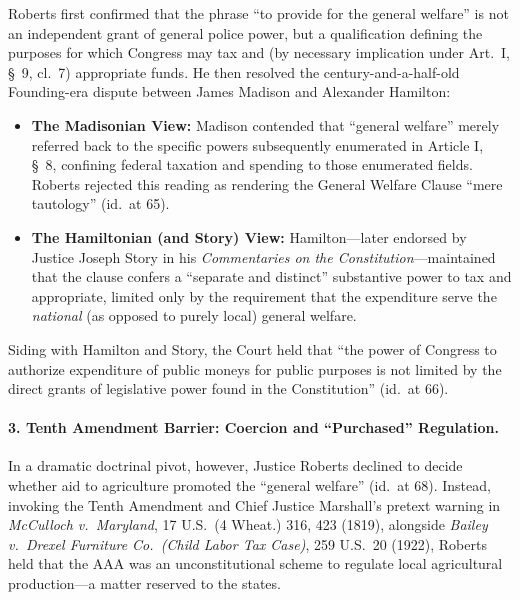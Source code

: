 \documentclass[12pt]{article}
\begin{document}
Roberts first confirmed that the phrase ``to provide for the general welfare'' is not an independent grant of general police power, but a qualification defining the purposes for which Congress may tax and (by necessary implication under Art.\ I, \S\ 9, cl.\ 7) appropriate funds. He then resolved the century-and-a-half-old Founding-era dispute between James Madison and Alexander Hamilton:
\begin{itemize}
  \item \textbf{The Madisonian View:} Madison contended that ``general welfare'' merely referred back to the specific powers subsequently enumerated in Article I, \S\ 8, confining federal taxation and spending to those enumerated fields. Roberts rejected this reading as rendering the General Welfare Clause ``mere tautology'' (id.\ at 65).
  \item \textbf{The Hamiltonian (and Story) View:} Hamilton---later endorsed by Justice Joseph Story in his \textit{Commentaries on the Constitution}---maintained that the clause confers a ``separate and distinct'' substantive power to tax and appropriate, limited only by the requirement that the expenditure serve the \textit{national} (as opposed to purely local) general welfare.
\end{itemize}
Siding with Hamilton and Story, the Court held that ``the power of Congress to authorize expenditure of public moneys for public purposes is not limited by the direct grants of legislative power found in the Constitution'' (id.\ at 66).

\paragraph{3. Tenth Amendment Barrier: Coercion and ``Purchased'' Regulation.}
In a dramatic doctrinal pivot, however, Justice Roberts declined to decide whether aid to agriculture promoted the ``general welfare'' (id.\ at 68). Instead, invoking the Tenth Amendment and Chief Justice Marshall's pretext warning in \textit{McCulloch v.\ Maryland}, 17 U.S.\ (4 Wheat.) 316, 423 (1819), alongside \textit{Bailey v.\ Drexel Furniture Co.\ (Child Labor Tax Case)}, 259 U.S.\ 20 (1922), Roberts held that the AAA was an unconstitutional scheme to regulate local agricultural production---a matter reserved to the states.
\end{document}

